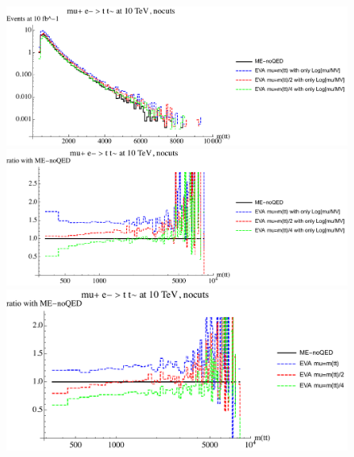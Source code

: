 \documentclass[a4paper,11pt]{article}
\begin{document}
\begin{figure}[ht]
\includegraphics[width=0.46\linewidth]{Notebooks/PlotDistr/ZZ_tt/10TeVnocuts/plotmtt.pdf}
\includegraphics[width=0.46\linewidth]{Notebooks/PlotDistr/ZZ_tt/10TeVnocuts/plotmttratio1.pdf}
\includegraphics[width=0.46\linewidth]{Notebooks/PlotDistr/ZZ_tt/10TeVnocuts/plotmttratio2.pdf}
\end{figure}



%
\end{document}
